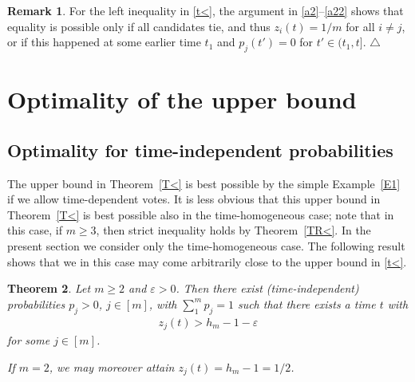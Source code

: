 \documentclass[11pt,reqno,tbtags,a4paper]{amsart}
\numberwithin{equation}{section}
\renewcommand\ge{\geq}
\renewcommand\geq{\geqslant}
\theoremstyle{plain}%
\newtheorem{theorem}{Theorem}[section]
\theoremstyle{definition}
\newcommand\xqed[1]{%
    \leavevmode\unskip\penalty9999 \hbox{}\nobreak\hfill
    \quad\hbox{#1}}
\newtheorem{remarkqqq}[theorem]{Remark}
\newenvironment{remark}{\begin{remarkqqq}}
  {\xqed{$\triangle$}\end{remarkqqq}}
\theoremstyle{remark}
\newcommand{\refT}[1]{Theorem~\ref{#1}}
\newcommand{\refE}[1]{Example~\ref{#1}}
\newcommand\eps{\varepsilon}
\newcommand\0{{\boldsymbol 0}}
\newcommand\1{{\boldsymbol 1}}
\begin{document}
\begin{remark}\label{Rleft}
  For the left inequality in \eqref{t<}, the argument in
  \eqref{a2}--\eqref{a22} shows that equality is possible only if 
all candidates tie, and thus $z_i(t)=1/m$ for all $i\neq j$,
or if this happened at some earlier time $t_1$ and $p_j(t')=0$ for
$t'\in(t_1,t]$. 
\end{remark}


\section{Optimality of the upper bound}\label{Sopt}
\subsection{Optimality for time-independent probabilities}\label{Snonconst}
The upper bound in \refT{T<} is  best possible by the simple \refE{E1}
if we allow
time-dependent votes.
It is less obvious that this upper bound in \refT{T<} is best possible also
in the time-homogeneous case; note that in this case, if $m\ge 3$, then
strict inequality holds  by \refT{TR<}.
In the present section we consider only the time-homogeneous case.
The following result shows that we in this case
may come arbitrarily close to the upper bound in \eqref{t<}.

\begin{theorem}\label{T>}
  Let $m\ge2$ and $\eps>0$. Then there exist (time-independent)
  probabilities $p_j>0$, $j\in[m]$, with $\sum_1^m p_j=1$
such that there exists a time $t$ with
\begin{align}\label{t>}
  z_j(t) > h_m-1-\eps
\end{align}
for some $j\in[m]$.

If $m=2$, we may moreover attain $z_j(t)=h_m-1=1/2$.
\end{theorem}
\end{document}
